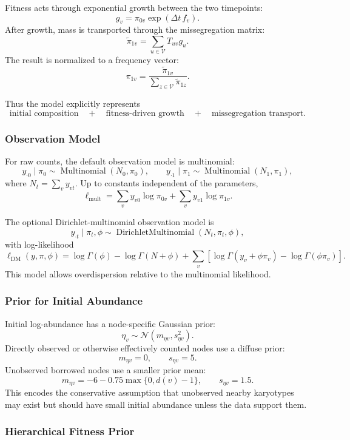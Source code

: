 \documentclass[11pt]{article}
\newcommand{\Normal}{\mathcal{N}}
\newcommand{\Mult}{\operatorname{Multinomial}}
\newcommand{\DM}{\operatorname{DirichletMultinomial}}
\begin{document}
Fitness acts through exponential growth between the two timepoints:
\[
  g_v = \pi_{0v}\exp(\Delta t\,f_v).
\]
After growth, mass is transported through the missegregation matrix:
\[
  \tilde\pi_{1v}
  =
  \sum_{u\in\mathcal{V}} T_{uv}g_u.
\]
The result is normalized to a frequency vector:
\[
  \pi_{1v}
  =
  \frac{\tilde\pi_{1v}}
       {\sum_{z\in\mathcal{V}}\tilde\pi_{1z}}.
\]

Thus the model explicitly represents
\[
  \text{initial composition}
  \quad+\quad
  \text{fitness-driven growth}
  \quad+\quad
  \text{missegregation transport}.
\]

\subsubsection{Observation Model}

For raw counts, the default observation model is multinomial:
\[
  y_{\cdot 0}\mid \pi_0
  \sim
  \Mult(N_0,\pi_0),
  \qquad
  y_{\cdot 1}\mid \pi_1
  \sim
  \Mult(N_1,\pi_1),
\]
where $N_t=\sum_v y_{vt}$. Up to constants independent of the parameters,
\[
  \ell_{\mathrm{mult}}
  =
  \sum_v y_{v0}\log \pi_{0v}
  +
  \sum_v y_{v1}\log \pi_{1v}.
\]

The optional Dirichlet-multinomial observation model is
\[
  y_{\cdot t}\mid \pi_t,\phi
  \sim
  \DM(N_t,\pi_t,\phi),
\]
with log-likelihood
\[
  \ell_{\mathrm{DM}}(y,\pi,\phi)
  =
  \log\Gamma(\phi)
  -
  \log\Gamma(N+\phi)
  +
  \sum_v
  \left[
    \log\Gamma(y_v+\phi\pi_v)
    -
    \log\Gamma(\phi\pi_v)
  \right].
\]
This model allows overdispersion relative to the multinomial likelihood.

\subsubsection{Prior for Initial Abundance}

Initial log-abundance has a node-specific Gaussian prior:
\[
  \eta_v \sim \Normal(m_{\eta v},s_{\eta v}^2).
\]
Directly observed or otherwise effectively counted nodes use a diffuse prior:
\[
  m_{\eta v}=0,\qquad s_{\eta v}=5.
\]
Unobserved borrowed nodes use a smaller prior mean:
\[
  m_{\eta v}
  =
  -6 - 0.75\max\{0,d(v)-1\},
  \qquad
  s_{\eta v}=1.5.
\]
This encodes the conservative assumption that unobserved nearby karyotypes may
exist but should have small initial abundance unless the data support them.

\subsubsection{Hierarchical Fitness Prior}
\end{document}
